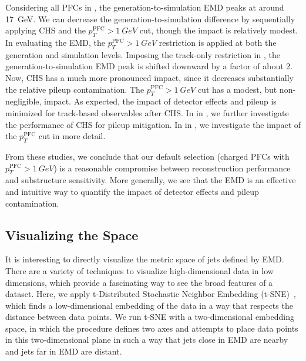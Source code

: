 \documentclass[aps,prd,twocolumn,preprintnumbers,nofootinbib,longbibliography,floatfix,superscriptaddress]{revtex4-1}
\begin{document}
Considering all PFCs in , the generation-to-simulation EMD peaks at around \SI{17}{GeV}.
%
We can decrease the generation-to-simulation difference by sequentially applying CHS and the $p_T^\text{PFC} > \SI{1}{GeV}$ cut, though the impact is relatively modest.
%
In evaluating the EMD, the $p_T^\text{PFC} > \SI{1}{GeV}$ restriction is applied at both the generation and simulation levels.
%
Imposing the track-only restriction in , the generation-to-simulation EMD peak is shifted downward by a factor of about 2.
%
Now, CHS has a much more pronounced impact, since it decreases substantially the relative pileup contamination.
%
The $p_T^\text{PFC} > \SI{1}{GeV}$ cut has a modest, but non-negligible, impact.
%
As expected, the impact of detector effects and pileup is minimized for track-based observables after CHS.
%
In  in , we further investigate the performance of CHS for pileup mitigation.
%
In  in , we investigate the impact of the $p_T^\text{PFC}$ cut in more detail.


From these studies, we conclude that our default selection (charged PFCs with $p_T^\text{PFC} > \SI{1}{GeV}$) is a reasonable compromise between reconstruction performance and substructure sensitivity.
%
More generally, we see that the EMD is an effective and intuitive way to quantify the impact of detector effects and pileup contamination.


\subsection{Visualizing the Space}
\label{subsec:emd_tsne}


It is interesting to directly visualize the metric space of jets defined by EMD.
%
There are a variety of techniques to visualize high-dimensional data in low dimensions, which provide a fascinating way to see the broad features of a dataset.
%
Here, we apply t-Distributed Stochastic Neighbor Embedding (t-SNE)~\cite{vanDerMaaten2008,DBLP:journals/jmlr/Maaten09,DBLP:journals/ml/MaatenH12,DBLP:journals/jmlr/Maaten14}, which finds a low-dimensional embedding of the data in a way that respects the distance between data points.
%
We run t-SNE with a two-dimensional embedding space, in which the procedure defines two axes and attempts to place data points in this two-dimensional plane in such a way that jets close in EMD are nearby and jets far in EMD are distant.
\end{document}
